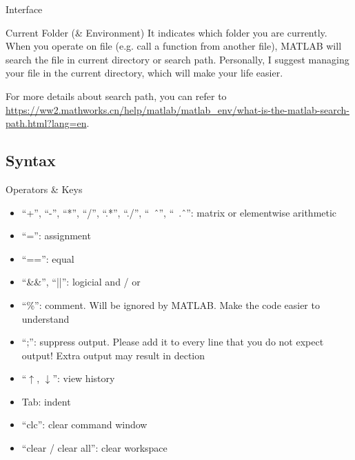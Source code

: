 \begin{frame}{Interface}
\begin{block}{Current Folder (\& Environment)}
It indicates which folder you are currently. When you operate on file (e.g. call a function from another file), MATLAB will search the file in current directory or search path. Personally, I suggest managing your file in the current directory, which will make your life easier.

For more details about search path, you can refer to \url{https://ww2.mathworks.cn/help/matlab/matlab_env/what-is-the-matlab-search-path.html?lang=en}.
\end{block}
\end{frame}

\subsection{Syntax}
\begin{frame}{Operators \& Keys}
\begin{itemize}
\item ``+'', ``-'', ``*'', ``/'', ``.*'', ``./'', ``\ \^\ '', ``\ .\^\ '': matrix or elementwise arithmetic
\item ``='': assignment
\item ``=='': equal
\item ``\&\&'', ``||'': logicial and / or
\item ``\%'': comment. Will be ignored by MATLAB. Make the code easier to understand
\item ``;'': suppress output. Please add it to every line that you do not expect output! Extra output may result in dection
\item ``$\uparrow$, $\downarrow$'': view history
\item Tab: indent
\item ``clc'': clear command window
\item ``clear / clear all'': clear workspace
\end{itemize}
\end{frame}

